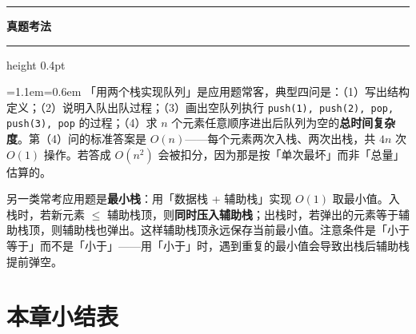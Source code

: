 \documentclass[11pt,openany,UTF8]{ctexbook}
\newcommand{\callouthead}[2]{%
  \par\addvspace{7pt}\noindent
  {\color{#1}\rule[-0.15em]{3pt}{1.05em}}\hspace{0.5em}%
  {\bfseries\color{#1}#2}\par\nobreak\vspace{-0.35em}%
  {\color{rulesep}\hrule height 0.4pt}\nobreak\vspace{0.45em}%
  \begingroup\small\setlength{\parindent}{0pt}%
  \leftskip=1.1em\rightskip=0.6em\noindent\ignorespaces}
\newcommand{\calloutend}{\par\endgroup\addvspace{7pt}}
\newenvironment{callexam}[1]{\callouthead{exambar}{#1}}{\calloutend}
\begin{document}
\begin{callexam}{真题考法}
「用两个栈实现队列」是应用题常客，典型四问是：（1）写出结构定义；（2）说明入队出队过程；（3）画出空队列执行 \texttt{push(1)\allowbreak{},\allowbreak{} push(2)\allowbreak{},\allowbreak{} pop,\allowbreak{} push(3)\allowbreak{},\allowbreak{} pop} 的过程；（4）求 $n$ 个元素任意顺序进出后队列为空的\textbf{总时间复杂度}。第（4）问的标准答案是 \textbf{$O(n)$}——每个元素两次入栈、两次出栈，共 $4n$ 次 $O(1)$ 操作。若答成 $O(n^2)$ 会被扣分，因为那是按「单次最坏」而非「总量」估算的。

另一类常考应用题是\textbf{最小栈}：用「数据栈 + 辅助栈」实现 $O(1)$ 取最小值。入栈时，若新元素 $\le$ 辅助栈顶，则\textbf{同时压入辅助栈}；出栈时，若弹出的元素等于辅助栈顶，则辅助栈也弹出。这样辅助栈顶永远保存当前最小值。注意条件是「小于等于」而不是「小于」——用「小于」时，遇到重复的最小值会导致出栈后辅助栈提前弹空。

\end{callexam}

\section*{本章小结表}
\end{document}
